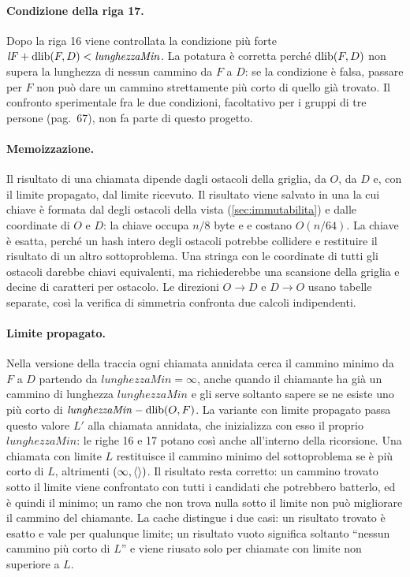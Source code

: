 \paragraph{Condizione della riga 17.} Dopo la riga 16 viene controllata la
condizione più forte $\mathit{lF} + \operatorname{dlib}(F,D) < \mathit{lunghezzaMin}$. La
potatura è corretta perché $\operatorname{dlib}(F,D)$ non supera la lunghezza di nessun
cammino da $F$ a $D$: se la condizione è falsa, passare per $F$ non può dare
un cammino strettamente più corto di quello già trovato. Il confronto
sperimentale fra le due condizioni, facoltativo per i gruppi di tre persone
(pag.~67), non fa parte di questo progetto.

\paragraph{Memoizzazione.} Il risultato di una chiamata dipende dagli
ostacoli della griglia, da $O$, da $D$ e, con il limite propagato, dal limite
ricevuto. Il risultato viene salvato in una  la cui chiave è
formata dal  degli ostacoli della vista (\cref{sec:immutabilita})
e dalle coordinate di $O$ e $D$: la chiave occupa $n/8$ byte e
 e  costano $O(n/64)$. La chiave è esatta, perché
un hash intero degli ostacoli potrebbe collidere e restituire il risultato di
un altro sottoproblema. Una stringa con le coordinate di tutti gli ostacoli
darebbe chiavi equivalenti, ma richiederebbe una scansione della griglia e
decine di caratteri per ostacolo. Le
direzioni $O \to D$ e $D \to O$ usano tabelle separate, così la verifica di
simmetria confronta due calcoli indipendenti.

\paragraph{Limite propagato.} Nella versione della traccia ogni chiamata
annidata cerca il cammino minimo da $F$ a $D$ partendo da
$\mathit{lunghezzaMin} = \infty$, anche quando il chiamante ha già un cammino
di lunghezza $\mathit{lunghezzaMin}$ e gli serve soltanto sapere se ne esiste
uno più corto di $\mathit{lunghezzaMin} - \operatorname{dlib}(O,F)$. La variante con limite
propagato passa questo valore $L'$ alla chiamata annidata, che inizializza
con esso il proprio $\mathit{lunghezzaMin}$: le righe 16 e 17 potano così
anche all'interno della ricorsione. Una chiamata con limite $L$ restituisce
il cammino minimo del sottoproblema se è più corto di $L$, altrimenti
$(\infty, \langle  \rangle)$. Il risultato resta corretto: un cammino trovato sotto il
limite viene confrontato con tutti i candidati che potrebbero batterlo, ed è
quindi il minimo; un ramo che non trova nulla sotto il limite non può
migliorare il cammino del chiamante. La cache distingue i due casi: un
risultato trovato è esatto e vale per qualunque limite; un risultato vuoto
significa soltanto ``nessun cammino più corto di $L$'' e viene riusato solo
per chiamate con limite non superiore a $L$.

